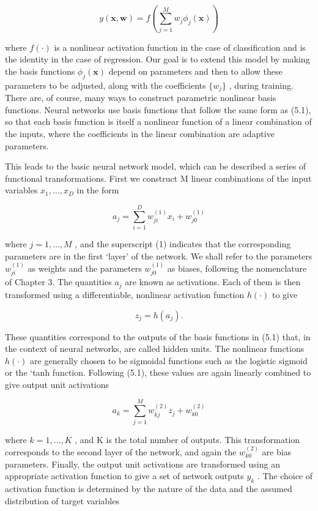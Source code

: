 \documentclass[
  10
]{article}
\begin{document}
\[
y (\mathbf {x}, \mathbf {w}) = f \left(\sum_ {j = 1} ^ {M} w _ {j} \phi_ {j} (\mathbf {x})\right)\tag{5.1}
\]

where \(f ( \cdot )\) is a nonlinear activation function in the case of
classification and is the identity in the case of regression. Our goal
is to extend this model by making the basis functions
\(\phi _ { j } ( \mathbf { x } )\) depend on parameters and then to
allow these parameters to be adjusted, along with the coefficients
\(\{ w _ { j } \}\) , during training. There are, of course, many ways
to construct parametric nonlinear basis functions. Neural networks use
basis functions that follow the same form as (5.1), so that each basis
function is itself a nonlinear function of a linear combination of the
inputs, where the coefficients in the linear combination are adaptive
parameters.

This leads to the basic neural network model, which can be described a
series of functional transformations. First we construct M linear
combinations of the input variables \(x _ { 1 } , \ldots , x _ { D }\)
in the form

\[
a _ {j} = \sum_ {i = 1} ^ {D} w _ {j i} ^ {(1)} x _ {i} + w _ {j 0} ^ {(1)}\tag{5.2}
\]

where \(j = 1 , \dots , M\) , and the superscript (1) indicates that the
corresponding parameters are in the first `layer' of the network. We
shall refer to the parameters \(w _ { j i } ^ { ( 1 ) }\) as weights and
the parameters \({ w _ { j 0 } ^ { ( 1 ) } }\) as biases, following the
nomenclature of Chapter 3. The quantities \(a _ { j }\) are known as
activations. Each of them is then transformed using a differentiable,
nonlinear activation function \(h ( \cdot )\) to give

\[
z _ {j} = h (a _ {j}).\tag{5.3}
\]

These quantities correspond to the outputs of the basis functions in
(5.1) that, in the context of neural networks, are called hidden units.
The nonlinear functions \(h ( \cdot )\) are generally chosen to be
sigmoidal functions such as the logistic sigmoid or the `tanh function.
Following (5.1), these values are again linearly combined to give output
unit activations

\[
a _ {k} = \sum_ {j = 1} ^ {M} w _ {k j} ^ {(2)} z _ {j} + w _ {k 0} ^ {(2)}\tag{5.4}
\]

where \(k = 1 , \ldots , K\) , and K is the total number of outputs.
This transformation corresponds to the second layer of the network, and
again the \(w _ { k 0 } ^ { ( 2 ) }\) are bias parameters. Finally, the
output unit activations are transformed using an appropriate activation
function to give a set of network outputs \(y _ { k }\) . The choice of
activation function is determined by the nature of the data and the
assumed distribution of target variables
\end{document}
